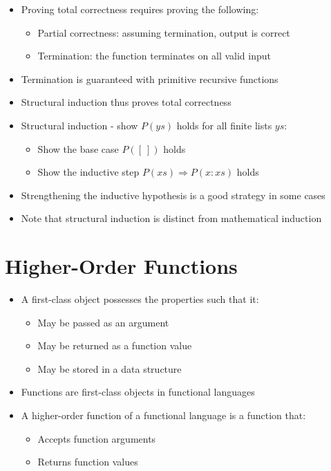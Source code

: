 \documentclass{article}
\begin{document}
\begin{itemize}
\item Proving total correctness requires proving the following:
\begin{itemize}
\item Partial correctness: assuming termination, output is correct
\item Termination: the function terminates on all valid input
\end{itemize}
\item Termination is guaranteed with primitive recursive functions
\item Structural induction thus proves total correctness
\item Structural induction - show $P(ys)$ holds for all finite lists $ys$:
\begin{itemize}
\item Show the base case $P([\:])$ holds
\item Show the inductive step $P(xs) \Rightarrow P(x:xs)$ holds
\end{itemize}
\item Strengthening the inductive hypothesis is a good strategy in some cases
\item Note that structural induction is distinct from mathematical induction
\end{itemize}

\section{Higher-Order Functions}

\begin{itemize}
\item A first-class object possesses the properties such that it:
\begin{itemize}
\item May be passed as an argument
\item May be returned as a function value
\item May be stored in a data structure
\end{itemize}
\item Functions are first-class objects in functional languages
\item A higher-order function of a functional language is a function that:
\begin{itemize}
\item Accepts function arguments
\item Returns function values
\end{itemize}
\end{itemize}
\end{document}
